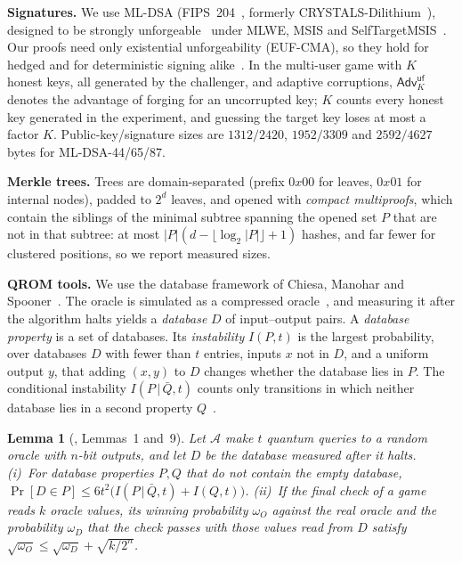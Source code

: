 \documentclass[10pt,journal,compsoc]{IEEEtran}
\theoremstyle{tplain}
\newtheorem{lemma}[theorem]{Lemma}
\theoremstyle{tdef}
\theoremstyle{remark}
\newcommand{\Adv}{\mathsf{Adv}}
\begin{document}
\noindent\textbf{Signatures.} We use ML-DSA (FIPS~204~\cite{FIPS204}, formerly CRYSTALS-Dilithium~\cite{dilithium2018}), designed to be strongly unforgeable~\cite[Sec.~3.1]{FIPS204} under MLWE, MSIS and SelfTargetMSIS~\cite[Sec.~4]{dilithium2018}. Our proofs need only existential unforgeability (EUF-CMA), so they hold for hedged and for deterministic signing alike~\cite[Sec.~3.4]{FIPS204}. In the multi-user game with $K$ honest keys, all generated by the challenger, and adaptive corruptions, $\Adv^{\mathsf{uf}}_{K}$ denotes the advantage of forging for an uncorrupted key; $K$ counts every honest key generated in the experiment, and guessing the target key loses at most a factor $K$. Public-key/signature sizes are $1312/2420$, $1952/3309$ and $2592/4627$ bytes for ML-DSA-44/65/87.

\noindent\textbf{Merkle trees.} Trees are domain-separated (prefix $0x00$ for leaves, $0x01$ for internal nodes), padded to $2^d$ leaves, and opened with \emph{compact multiproofs}, which contain the siblings of the minimal subtree spanning the opened set $P$ that are not in that subtree: at most $|P|(d-\lfloor\log_2|P|\rfloor+1)$ hashes, and far fewer for clustered positions, so we report measured sizes.

\noindent\textbf{QROM tools.} We use the database framework of Chiesa, Manohar and Spooner~\cite{chiesa2019qrom}. The oracle is simulated as a compressed oracle~\cite{zhandry2019record}, and measuring it after the algorithm halts yields a \emph{database} $D$ of input--output pairs. A \emph{database property} is a set of databases. Its \emph{instability} $I(P,t)$ is the largest probability, over databases $D$ with fewer than $t$ entries, inputs $x$ not in $D$, and a uniform output $y$, that adding $(x,y)$ to $D$ changes whether the database lies in $P$. The conditional instability $I(P\,|\,\bar Q,t)$ counts only transitions in which neither database lies in a second property $Q$~\cite[Def.~7]{chiesa2019qrom}.

\begin{lemma}[\cite{chiesa2019qrom}, Lemmas~1 and~9]\label{lem:extract}
Let $\mathcal A$ make $t$ quantum queries to a random oracle with $n$-bit outputs, and let $D$ be the database measured after it halts. (i)~For database properties $P,Q$ that do not contain the empty database, $\Pr[D\in P]\le 6t^2\big(I(P\,|\,\bar Q,t)+I(Q,t)\big)$. (ii)~If the final check of a game reads $k$ oracle values, its winning probability $\omega_O$ against the real oracle and the probability $\omega_D$ that the check passes with those values read from $D$ satisfy $\sqrt{\omega_O}\le\sqrt{\omega_D}+\sqrt{k/2^{n}}$.
\end{lemma}
\end{document}
